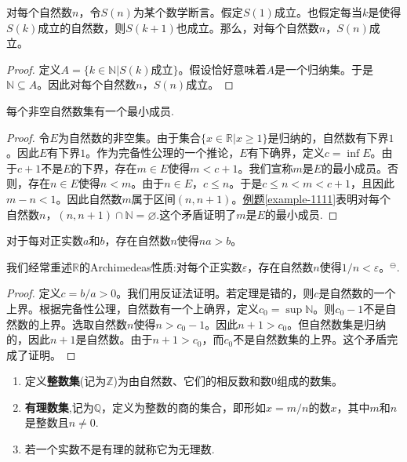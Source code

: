 \documentclass[lang=cn,newtx,10pt,scheme=chinese]{../Template/elegantbook}
\begin{document}
\begin{theorem}[数学归纳法原理]\label{theorem:数学归纳法原理}
  对每个自然数\(n\)，令\(S(n)\)为某个数学断言。假定\(S(1)\)成立。也假定每当\(k\)是使得\(S(k)\)成立的自然数，则\(S(k + 1)\)也成立。那么，对每个自然数\(n\)，\(S(n)\)成立。
\end{theorem}
\begin{proof}
  定义\(A = \{k\in\mathbb{N}|S(k)\)成立\(\}\)。假设恰好意味着\(A\)是一个归纳集。于是\(\mathbb{N}\subseteq A\)。因此对每个自然数\(n\)，\(S(n)\)成立。
\end{proof}

\begin{theorem}\label{theorem:每个非空自然数集有一个最小成员.}
  每个非空自然数集有一个最小成员.
\end{theorem}
\begin{proof}
  令\(E\)为自然数的非空集。由于集合\(\{x\in\mathbb{R}|x\geqslant1\}\)是归纳的，自然数有下界\(1\)。因此\(E\)有下界\(1\)。作为完备性公理的一个推论，\(E\)有下确界，定义\(c=\inf E\)。由于\(c + 1\)不是\(E\)的下界，存在\(m\in E\)使得\(m < c + 1\)。我们宣称\(m\)是\(E\)的最小成员。否则，存在\(n\in E\)使得\(n < m\)。由于\(n\in E\)，\(c\leqslant n\)。于是\(c\leqslant n < m < c + 1\)，且因此\(m - n < 1\)。因此自然数\(m\)属于区间\((n, n + 1)\)。\hyperref[example-1111]{例题\ref{example-1111}}表明对每个自然数\(n\)，\((n, n + 1)\cap\mathbb{N}=\varnothing\).这个矛盾证明了\(m\)是\(E\)的最小成员.
\end{proof}

\begin{theorem}[实数的Archimedeas性质]\label{theorem:实数的Archimedeas性质}
  对于每对正实数\(a\)和\(b\)，存在自然数\(n\)使得\(na > b\)。
\end{theorem}
\begin{note}
  我们经常重述\(\mathbb{R}\)的Archimedeas性质:对每个正实数\(\varepsilon\)，存在自然数\(n\)使得\(1/n<\varepsilon\)。$^{\ominus}$.
\end{note}
\begin{proof}
  定义\(c = b/a>0\)。我们用反证法证明。若定理是错的，则\(c\)是自然数的一个上界。根据完备性公理，自然数有一个上确界，定义\(c_0=\sup\mathbb{N}\)。则\(c_0 - 1\)不是自然数的上界。选取自然数\(n\)使得\(n>c_0 - 1\)。因此\(n + 1>c_0\)。但自然数集是归纳的，因此\(n + 1\)是自然数。由于\(n + 1>c_0\)，而\(c_0\)不是自然数集的上界。这个矛盾完成了证明。
\end{proof}

\begin{definition}\label{definition:整数集、有理数集和无理数}
\begin{enumerate}
  \item 定义\textbf{整数集}(记为\(\mathbb{Z}\))为由自然数、它们的相反数和数\(0\)组成的数集。
  \item \textbf{有理数集},记为\(\mathbb{Q}\)，定义为整数的商的集合，即形如\(x = m/n\)的数\(x\)，其中\(m\)和\(n\)是整数且\(n\neq0\).
  \item 若一个实数不是有理的就称它为无理数.
\end{enumerate}
\end{definition}
\end{document}
